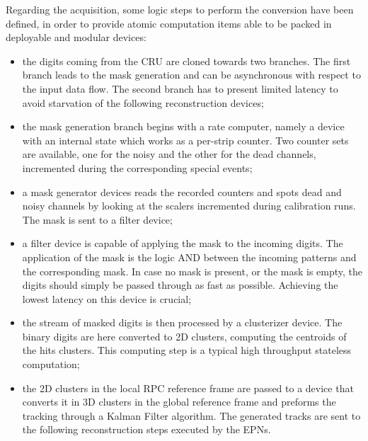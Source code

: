 Regarding the acquisition, some logic steps to perform the conversion have been defined, in order to provide atomic computation items able to be packed in deployable and modular devices:
\begin{itemize}
    \item the digits coming from the CRU are cloned towards two branches.
    The first branch leads to the mask generation and can be asynchronous with respect to the input data flow.
    The second branch has to present limited latency to avoid starvation of the following reconstruction devices;
    \item the mask generation branch begins with a rate computer, namely a device with an internal state which works as a per-strip counter.
	Two counter sets are available, one for the noisy and the other for the dead channels, incremented during the corresponding special events;
    \item  a mask generator devices reads the recorded counters and spots dead and noisy channels by looking at the scalers incremented during calibration runs.
    The mask is sent to a filter device;
    \item a filter device is capable of applying the mask to the incoming digits.
    The application of the mask is the logic AND between the incoming patterns and the corresponding mask.
    In case no mask is present, or the mask is empty, the digits should simply be passed through as fast as possible.
    Achieving the lowest latency on this device is crucial;
    \item the stream of masked digits is then processed by a clusterizer device. The binary digits are here converted to 2D clusters, computing the centroids of the hits clusters. 
    This computing step is a typical high throughput stateless computation;
    \item the 2D clusters in the local RPC reference frame are passed to a device that converts it in 3D clusters in the global reference frame and preforms the tracking through a Kalman Filter algorithm.
    The generated tracks are sent to the following reconstruction steps executed by the EPNs.
\end{itemize}

